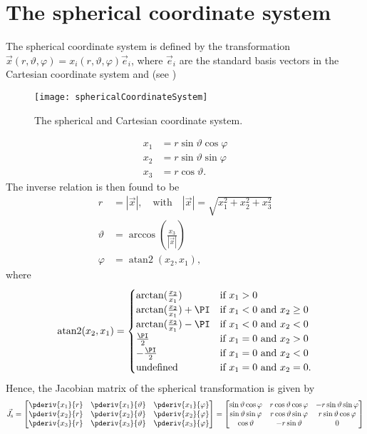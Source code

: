 \section{The spherical coordinate system}
\label{Sec1:sphericalCoordinates}
The spherical coordinate system is defined by the transformation $\vec{x}(r,\vartheta,\varphi)=x_i(r,\vartheta,\varphi)\vec{e}_i$, where $\vec{e}_i$ are the standard basis vectors in the Cartesian coordinate system and (see )
\begin{figure}
	\centering
	\texttt{[image: sphericalCoordinateSystem]}
	\caption{The spherical and Cartesian coordinate system.}
	\label{Fig1:SphericalCoordinateSystem}
\end{figure}
\begin{align}
	x_1 &= r\sin\vartheta\cos\varphi\\
	x_2 &= r\sin\vartheta\sin\varphi\\
	x_3 &= r\cos\vartheta.
\end{align}
The inverse relation is then found to be
\begin{align}
	r &= |\vec{x}|,\quad\text{with}\quad |\vec{x}|=\sqrt{x_1^2+x_2^2+x_3^2}\\
	\vartheta &= \arccos\left(\frac{x_3}{|\vec{x}|}\right)\\
	\varphi &= \operatorname{atan2}(x_2,x_1),
\end{align}
where
\begin{equation}
	\operatorname{atan2}(x_2,x_1) = \begin{cases}
	\arctan(\frac{x_2}{x_1}) & \mbox{if } x_1 > 0\\
	\arctan(\frac{x_2}{x_1}) + \PI & \mbox{if } x_1 < 0 \mbox{ and } x_2 \ge 0\\
	\arctan(\frac{x_2}{x_1}) - \PI & \mbox{if } x_1 < 0 \mbox{ and } x_2 < 0\\
	\frac{\PI}{2} & \mbox{if } x_1 = 0 \mbox{ and } x_2 > 0\\
	-\frac{\PI}{2} & \mbox{if } x_1 = 0 \mbox{ and } x_2 < 0\\
	\text{undefined} & \mbox{if } x_1 = 0 \mbox{ and } x_2 = 0.
	\end{cases}
\end{equation}
Hence, the Jacobian matrix of the spherical transformation is given by
\begin{equation}
	\vec{J}_{\mathrm{s}} = \begin{bmatrix}
		\pderiv{x_1}{r} & \pderiv{x_1}{\vartheta} & \pderiv{x_1}{\varphi}\\
		\pderiv{x_2}{r} & \pderiv{x_2}{\vartheta} & \pderiv{x_2}{\varphi}\\
		\pderiv{x_3}{r} & \pderiv{x_3}{\vartheta} & \pderiv{x_3}{\varphi}
	\end{bmatrix} = \begin{bmatrix}
		\sin\vartheta\cos\varphi & r\cos\vartheta\cos\varphi & -r\sin\vartheta\sin\varphi\\
		\sin\vartheta\sin\varphi & r\cos\vartheta\sin\varphi & r\sin\vartheta\cos\varphi\\
		\cos\vartheta & -r\sin\vartheta & 0
	\end{bmatrix}
\end{equation}
